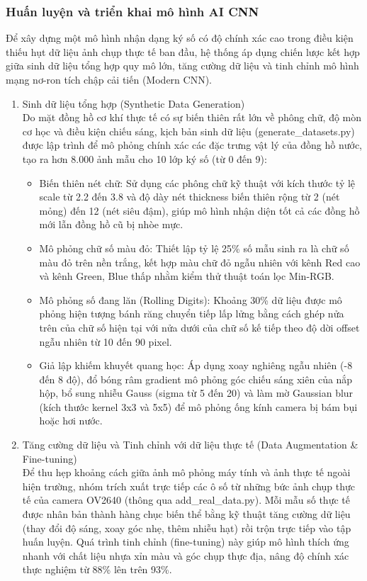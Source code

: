 \subsubsection{Huấn luyện và triển khai mô hình AI CNN}

Để xây dựng một mô hình nhận dạng ký số có độ chính xác cao trong điều kiện thiếu hụt dữ liệu ảnh chụp thực tế ban đầu, hệ thống áp dụng chiến lược kết hợp giữa sinh dữ liệu tổng hợp quy mô lớn, tăng cường dữ liệu và tinh chỉnh mô hình mạng nơ-ron tích chập cải tiến (Modern CNN).

\begin{enumerate}
    \item Sinh dữ liệu tổng hợp (Synthetic Data Generation) \\
    Do mặt đồng hồ cơ khí thực tế có sự biến thiên rất lớn về phông chữ, độ mòn cơ học và điều kiện chiếu sáng, kịch bản sinh dữ liệu (generate\_datasets.py) được lập trình để mô phỏng chính xác các đặc trưng vật lý của đồng hồ nước, tạo ra hơn 8.000 ảnh mẫu cho 10 lớp ký số (từ 0 đến 9):
    \begin{itemize}
        \item Biến thiên nét chữ: Sử dụng các phông chữ kỹ thuật với kích thước tỷ lệ scale từ 2.2 đến 3.8 và độ dày nét thickness biến thiên rộng từ 2 (nét mỏng) đến 12 (nét siêu đậm), giúp mô hình nhận diện tốt cả các đồng hồ mới lẫn đồng hồ cũ bị nhòe mực.
        \item Mô phỏng chữ số màu đỏ: Thiết lập tỷ lệ 25\% số mẫu sinh ra là chữ số màu đỏ trên nền trắng, kết hợp màu chữ đỏ ngẫu nhiên với kênh Red cao và kênh Green, Blue thấp nhằm kiểm thử thuật toán lọc Min-RGB.
        \item Mô phỏng số đang lăn (Rolling Digits): Khoảng 30\% dữ liệu được mô phỏng hiện tượng bánh răng chuyển tiếp lấp lửng bằng cách ghép nửa trên của chữ số hiện tại với nửa dưới của chữ số kế tiếp theo độ dời offset ngẫu nhiên từ 10 đến 90 pixel.
        \item Giả lập khiếm khuyết quang học: Áp dụng xoay nghiêng ngẫu nhiên (-8 đến 8 độ), đổ bóng râm gradient mô phỏng góc chiếu sáng xiên của nắp hộp, bổ sung nhiễu Gauss (sigma từ 5 đến 20) và làm mờ Gaussian blur (kích thước kernel 3x3 và 5x5) để mô phỏng ống kính camera bị bám bụi hoặc hơi nước.
    \end{itemize}

    \item Tăng cường dữ liệu và Tinh chỉnh với dữ liệu thực tế (Data Augmentation \& Fine-tuning) \\
    Để thu hẹp khoảng cách giữa ảnh mô phỏng máy tính và ảnh thực tế ngoài hiện trường, nhóm trích xuất trực tiếp các ô số từ những bức ảnh chụp thực tế của camera OV2640 (thông qua add\_real\_data.py). Mỗi mẫu số thực tế được nhân bản thành hàng chục biến thể bằng kỹ thuật tăng cường dữ liệu (thay đổi độ sáng, xoay góc nhẹ, thêm nhiễu hạt) rồi trộn trực tiếp vào tập huấn luyện. Quá trình tinh chỉnh (fine-tuning) này giúp mô hình thích ứng nhanh với chất liệu nhựa xỉn màu và góc chụp thực địa, nâng độ chính xác thực nghiệm từ 88\% lên trên 93\%.


\end{enumerate}
